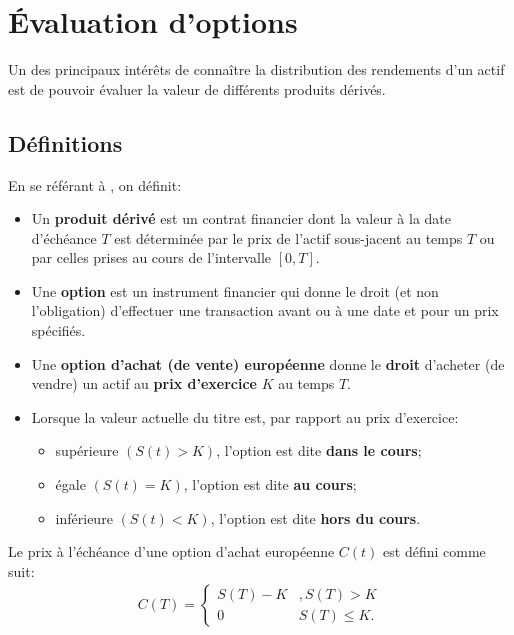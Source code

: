 \chapter{Évaluation d'options}
\label{chap:options}
Un des principaux intérêts de connaître la distribution des rendements
d'un actif est de pouvoir évaluer la valeur de différents produits
dérivés.

\section{Définitions}
\label{sec:options}
En se référant à \cite{bingham2004risk}, on définit:

\begin{itemize}
\item Un \textbf{produit dérivé} est un contrat financier dont la
  valeur à la date d'échéance $T$ est déterminée par le prix de
  l'actif sous-jacent au temps $T$ ou par celles prises au cours de
  l'intervalle $\left[0,T \right]$.
\item Une \textbf{option} est un instrument financier qui donne le
  droit (et non l'obligation) d'effectuer une transaction avant ou à
  une date et pour un prix spécifiés.
\item Une \textbf{option d'achat (de vente) européenne} donne le
  \textbf{droit} d'acheter (de vendre) un actif au \textbf{prix
    d'exercice} $K$ au temps $T$.
\item Lorsque la valeur actuelle du titre est, par rapport au prix
  d'exercice:
  \begin{itemize}
  \item supérieure $(S(t)>K)$, l'option est dite \textbf{dans le
      cours};
  \item égale $(S(t)=K)$, l'option est dite \textbf{au cours};
  \item inférieure $(S(t)<K)$, l'option est dite \textbf{hors du
      cours}.
  \end{itemize}
\end{itemize}

Le prix à l'échéance d'une option d'achat européenne $C(t)$ est défini
comme suit:
\begin{align}
  \label{eq:callpayoff}
  C(T) = \left\{ \begin{array}{cc} 
      S(T)-K & ,S(T) > K \\
      0 & S(T) \leq K.
    \end{array} \right.
\end{align}

